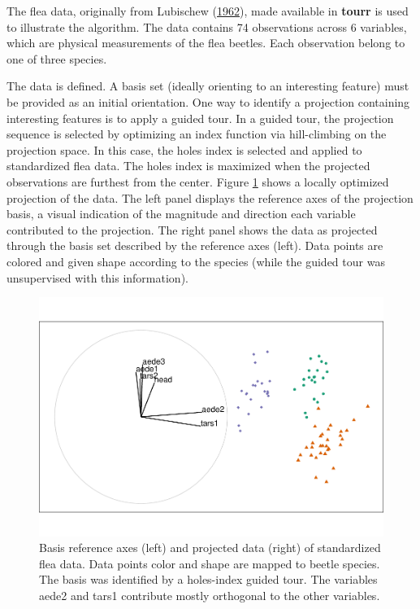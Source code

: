 The flea data, originally from Lubischew
(\protect\hyperlink{ref-lubischew_use_1962}{1962}), made available in
\textbf{tourr} is used to illustrate the algorithm. The data contains 74
observations across 6 variables, which are physical measurements of the
flea beetles. Each observation belong to one of three species.

The data is defined. A basis set (ideally orienting to an interesting
feature) must be provided as an initial orientation. One way to identify
a projection containing interesting features is to apply a guided tour.
In a guided tour, the projection sequence is selected by optimizing an
index function via hill-climbing on the projection space. In this case,
the holes index is selected and applied to standardized flea data. The
holes index is maximized when the projected observations are furthest
from the center. Figure \ref{fig:step0} shows a locally optimized
projection of the data. The left panel displays the reference axes of
the projection basis, a visual indication of the magnitude and direction
each variable contributed to the projection. The right panel shows the
data as projected through the basis set described by the reference axes
(left). Data points are colored and given shape according to the species
(while the guided tour was unsupervised with this information).

\begin{Schunk}
\begin{figure}

{\centering \includegraphics[width=0.7\linewidth]{spinifex_paper_files/figure-latex/step0-1} 

}

\caption[Basis reference axes (left) and projected data (right) of standardized flea data]{Basis reference axes (left) and projected data (right) of standardized flea data. Data points color and shape are mapped to beetle species. The basis was identified by a holes-index guided tour. The variables aede2 and tars1 contribute mostly orthogonal to the other variables.}\label{fig:step0}
\end{figure}
\end{Schunk}

